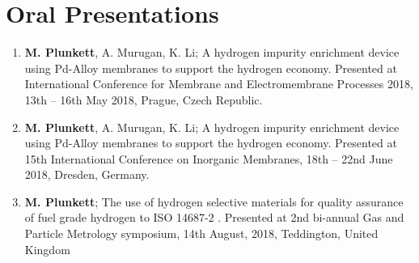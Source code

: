 \documentclass[a4paper,12pt]{report}
\begin{document}
\section*{Oral Presentations}
\begin{enumerate}
    \item \textbf{M. Plunkett}, A. Murugan, K. Li; A hydrogen impurity enrichment device using Pd-Alloy membranes to support the hydrogen economy. Presented at International Conference for Membrane and Electromembrane Processes 2018, 13th – 16th May 2018, Prague, Czech Republic.
    \item \textbf{M. Plunkett}, A. Murugan, K. Li; A hydrogen impurity enrichment device using Pd-Alloy membranes to support the hydrogen economy. Presented at 15th International Conference on Inorganic Membranes, 18th – 22nd June 2018, Dresden, Germany. 
    \item \textbf{M. Plunkett}; The use of hydrogen selective materials for quality assurance of fuel grade hydrogen to ISO 14687-2 . Presented at 2nd bi-annual Gas and Particle Metrology symposium, 14th August, 2018, Teddington, United Kingdom 
\end{enumerate}

\listoffigures
\listoftables



\tableofcontents















\end{document}

